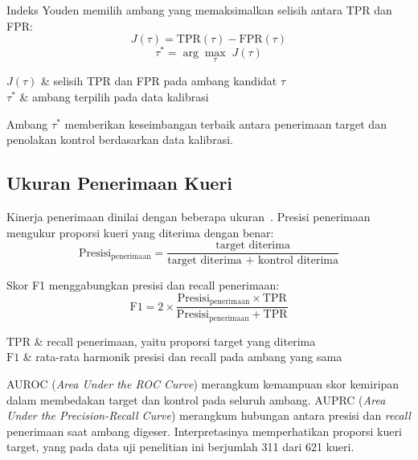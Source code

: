 Indeks Youden memilih ambang yang memaksimalkan selisih antara TPR dan FPR:
\begin{equation}\label{eq:youden-j}
J(\tau) = \mathrm{TPR}(\tau) - \mathrm{FPR}(\tau)
\end{equation}
\begin{equation}\label{eq:youden-opt}
\tau^* = \arg\max_\tau\; J(\tau)
\end{equation}
\begin{keteranganRumus}
$J(\tau)$ & selisih TPR dan FPR pada ambang kandidat $\tau$ \\
$\tau^*$ & ambang terpilih pada data kalibrasi
\end{keteranganRumus}

Ambang $\tau^*$ memberikan keseimbangan terbaik antara penerimaan target dan penolakan kontrol berdasarkan data kalibrasi.

\subsection{Ukuran Penerimaan Kueri}

Kinerja penerimaan dinilai dengan beberapa ukuran~\cite{hassanzad2024youden}. Presisi penerimaan mengukur proporsi kueri yang diterima dengan benar:
\begin{equation}\label{eq:acceptance-precision}
\mathrm{Presisi}_{\mathrm{penerimaan}} = \frac{\text{target diterima}}{\text{target diterima + kontrol diterima}}
\end{equation}

Skor F1 menggabungkan presisi dan recall penerimaan:
\begin{equation}\label{eq:f1}
\mathrm{F1} = 2 \times \frac{\mathrm{Presisi}_{\mathrm{penerimaan}} \times \mathrm{TPR}}{\mathrm{Presisi}_{\mathrm{penerimaan}} + \mathrm{TPR}}
\end{equation}
\begin{keteranganRumus}
$\mathrm{TPR}$ & recall penerimaan, yaitu proporsi target yang diterima \\
$\mathrm{F1}$ & rata-rata harmonik presisi dan recall pada ambang yang sama
\end{keteranganRumus}

AUROC (\textit{Area Under the ROC Curve}) merangkum kemampuan skor kemiripan dalam membedakan target dan kontrol pada seluruh ambang. AUPRC (\textit{Area Under the Precision-Recall Curve}) merangkum hubungan antara presisi dan \textit{recall} penerimaan saat ambang digeser. Interpretasinya memperhatikan proporsi kueri target, yang pada data uji penelitian ini berjumlah 311 dari 621 kueri.

